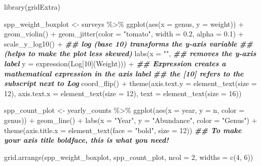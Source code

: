\documentclass[
]{article}
\newenvironment{Shaded}{\begin{snugshade}}{\end{snugshade}}
\newcommand{\AttributeTok}[1]{\textcolor[rgb]{0.77,0.63,0.00}{#1}}
\newcommand{\DecValTok}[1]{\textcolor[rgb]{0.00,0.00,0.81}{#1}}
\newcommand{\DocumentationTok}[1]{\textcolor[rgb]{0.56,0.35,0.01}{\textbf{\textit{#1}}}}
\newcommand{\FloatTok}[1]{\textcolor[rgb]{0.00,0.00,0.81}{#1}}
\newcommand{\FunctionTok}[1]{\textcolor[rgb]{0.00,0.00,0.00}{#1}}
\newcommand{\NormalTok}[1]{#1}
\newcommand{\OtherTok}[1]{\textcolor[rgb]{0.56,0.35,0.01}{#1}}
\newcommand{\SpecialCharTok}[1]{\textcolor[rgb]{0.00,0.00,0.00}{#1}}
\newcommand{\StringTok}[1]{\textcolor[rgb]{0.31,0.60,0.02}{#1}}
\begin{document}
\begin{Shaded}
\begin{Highlighting}[]
\FunctionTok{library}\NormalTok{(gridExtra)}

\NormalTok{spp\_weight\_boxplot }\OtherTok{\textless{}{-}}\NormalTok{ surveys }\SpecialCharTok{\%\textgreater{}\%} 
  \FunctionTok{ggplot}\NormalTok{(}\FunctionTok{aes}\NormalTok{(}\AttributeTok{x =}\NormalTok{ genus, }\AttributeTok{y =}\NormalTok{ weight)) }\SpecialCharTok{+}
  \FunctionTok{geom\_violin}\NormalTok{() }\SpecialCharTok{+}
  \FunctionTok{geom\_jitter}\NormalTok{(}\AttributeTok{color =} \StringTok{"tomato"}\NormalTok{, }\AttributeTok{width =} \FloatTok{0.2}\NormalTok{, }\AttributeTok{alpha =} \FloatTok{0.1}\NormalTok{) }\SpecialCharTok{+} 
  \FunctionTok{scale\_y\_log10}\NormalTok{() }\SpecialCharTok{+}
  \DocumentationTok{\#\# log (base 10) transforms the y{-}axis variable}
  \DocumentationTok{\#\# (helps to make the plot less skewed)}
  \FunctionTok{labs}\NormalTok{(}\AttributeTok{x =} \StringTok{""}\NormalTok{, }
       \DocumentationTok{\#\# removes the y{-}axis label}
       \AttributeTok{y =} \FunctionTok{expression}\NormalTok{(Log[}\DecValTok{10}\NormalTok{](Weight))) }\SpecialCharTok{+}
  \DocumentationTok{\#\# Expression creates a mathematical expression in the axis label}
  \DocumentationTok{\#\# the [10] refers to the subscript next to Log}
  \FunctionTok{coord\_flip}\NormalTok{() }\SpecialCharTok{+} 
  \FunctionTok{theme}\NormalTok{(}\AttributeTok{axis.text.y =} \FunctionTok{element\_text}\NormalTok{(}\AttributeTok{size =} \DecValTok{12}\NormalTok{), }
        \AttributeTok{axis.text.x =} \FunctionTok{element\_text}\NormalTok{(}\AttributeTok{size =} \DecValTok{12}\NormalTok{), }
        \AttributeTok{text =} \FunctionTok{element\_text}\NormalTok{(}\AttributeTok{size =} \DecValTok{16}\NormalTok{))}

\NormalTok{spp\_count\_plot }\OtherTok{\textless{}{-}}\NormalTok{ yearly\_counts }\SpecialCharTok{\%\textgreater{}\%} 
  \FunctionTok{ggplot}\NormalTok{(}\FunctionTok{aes}\NormalTok{(}\AttributeTok{x =}\NormalTok{ year, }\AttributeTok{y =}\NormalTok{ n, }\AttributeTok{color =}\NormalTok{ genus)) }\SpecialCharTok{+}
  \FunctionTok{geom\_line}\NormalTok{() }\SpecialCharTok{+} 
  \FunctionTok{labs}\NormalTok{(}\AttributeTok{x =} \StringTok{"Year"}\NormalTok{, }
       \AttributeTok{y =} \StringTok{"Abundance"}\NormalTok{, }
       \AttributeTok{color =} \StringTok{"Genus"}\NormalTok{) }\SpecialCharTok{+}
  \FunctionTok{theme}\NormalTok{(}\AttributeTok{axis.title.x =} \FunctionTok{element\_text}\NormalTok{(}\AttributeTok{face =} \StringTok{"bold"}\NormalTok{, }\AttributeTok{size =} \DecValTok{12}\NormalTok{))}
\DocumentationTok{\#\# To make your axis title boldface, this is what you need!}

\FunctionTok{grid.arrange}\NormalTok{(spp\_weight\_boxplot, spp\_count\_plot, }\AttributeTok{ncol =} \DecValTok{2}\NormalTok{, }\AttributeTok{widths =} \FunctionTok{c}\NormalTok{(}\DecValTok{4}\NormalTok{, }\DecValTok{6}\NormalTok{))}
\end{Highlighting}
\end{Shaded}
\end{document}
